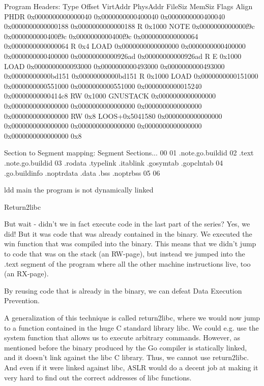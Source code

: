 Program Headers:
  Type           Offset             VirtAddr           PhysAddr
                 FileSiz            MemSiz              Flags  Align
  PHDR           0x0000000000000040 0x0000000000400040 0x0000000000400040
                 0x0000000000000188 0x0000000000000188  R      0x1000
  NOTE           0x0000000000000f9c 0x0000000000400f9c 0x0000000000400f9c
                 0x0000000000000064 0x0000000000000064  R      0x4
  LOAD           0x0000000000000000 0x0000000000400000 0x0000000000400000
                 0x00000000000926ad 0x00000000000926ad  R E    0x1000
  LOAD           0x0000000000093000 0x0000000000493000 0x0000000000493000
                 0x00000000000bd151 0x00000000000bd151  R      0x1000
  LOAD           0x0000000000151000 0x0000000000551000 0x0000000000551000
                 0x0000000000015240 0x00000000000414c8  RW     0x1000
  GNUSTACK      0x0000000000000000 0x0000000000000000 0x0000000000000000
                 0x0000000000000000 0x0000000000000000  RW     0x8
  LOOS+0x5041580 0x0000000000000000 0x0000000000000000 0x0000000000000000
                 0x0000000000000000 0x0000000000000000         0x8

 Section to Segment mapping:
  Segment Sections...
   00
   01     .note.go.buildid
   02     .text .note.go.buildid
   03     .rodata .typelink .itablink .gosymtab .gopclntab
   04     .go.buildinfo .noptrdata .data .bss .noptrbss
   05
   06

 ldd main
the program is not dynamically linked



 Return2libc

But wait - didn't we in fact execute code in the last part of the series? Yes, we did! But it was code that was already
contained in the binary. We executed the win function that was compiled into the binary. This means that we didn't
jump to code that was on the stack (an RW-page), but instead we jumped into the .text segment of the program where all
the other machine instructions live, too (an RX-page).

By reusing code that is already in the binary, we can defeat Data Execution Prevention.

A generalization of this technique is called return2libc, where we would now jump to a function contained in the huge
C standard library libc. We could e.g. use the system function that allows us to execute arbitrary commands. However,
as mentioned before the binary produced by the Go compiler is statically linked, and it doesn't link against the libc
C library. Thus, we cannot use return2libc. And even if it were linked against libc, ASLR would do a decent job at
making it very hard to find out the correct addresses of libc functions.


